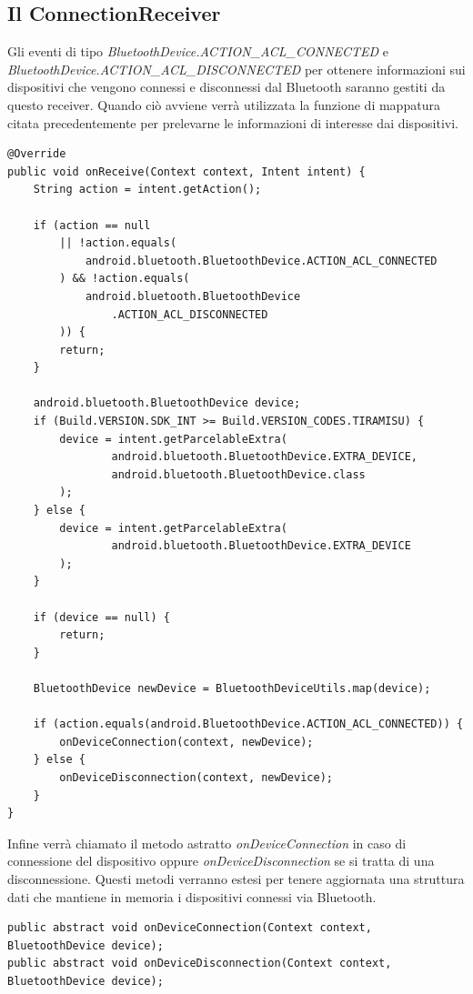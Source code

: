 \subsection{Il ConnectionReceiver}
Gli eventi di tipo \textit{BluetoothDevice.ACTION\_ACL\_CONNECTED} e \textit{BluetoothDevice.ACTION\_ACL\_DISCONNECTED} per ottenere informazioni sui dispositivi che vengono connessi e disconnessi dal Bluetooth saranno gestiti da questo receiver. Quando ciò avviene verrà utilizzata la funzione di mappatura citata precedentemente per prelevarne le informazioni di interesse dai dispositivi.
\begin{verbatim}
@Override
public void onReceive(Context context, Intent intent) {
    String action = intent.getAction();

    if (action == null 
        || !action.equals(
            android.bluetooth.BluetoothDevice.ACTION_ACL_CONNECTED
        ) && !action.equals(
            android.bluetooth.BluetoothDevice
                .ACTION_ACL_DISCONNECTED
        )) {
        return;
    }

    android.bluetooth.BluetoothDevice device;
    if (Build.VERSION.SDK_INT >= Build.VERSION_CODES.TIRAMISU) {
        device = intent.getParcelableExtra(
                android.bluetooth.BluetoothDevice.EXTRA_DEVICE,
                android.bluetooth.BluetoothDevice.class
        );
    } else {
        device = intent.getParcelableExtra(
                android.bluetooth.BluetoothDevice.EXTRA_DEVICE
        );
    }

    if (device == null) {
        return;
    }

    BluetoothDevice newDevice = BluetoothDeviceUtils.map(device);

    if (action.equals(android.BluetoothDevice.ACTION_ACL_CONNECTED)) {
        onDeviceConnection(context, newDevice);
    } else {
        onDeviceDisconnection(context, newDevice);
    }
}
\end{verbatim}

Infine verrà chiamato il metodo astratto \textit{onDeviceConnection} in caso di connessione del dispositivo oppure \textit{onDeviceDisconnection} se si tratta di una disconnessione. Questi metodi verranno estesi per tenere aggiornata una struttura dati che mantiene in memoria i dispositivi connessi via Bluetooth.
\begin{verbatim}
public abstract void onDeviceConnection(Context context, BluetoothDevice device);
public abstract void onDeviceDisconnection(Context context, BluetoothDevice device);
\end{verbatim}

